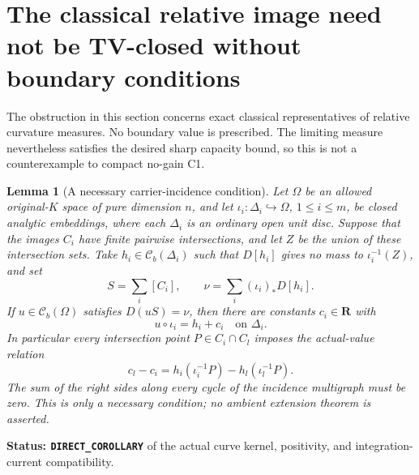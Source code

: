 \documentclass[11pt,a4paper]{article}
\numberwithin{equation}{section}
\newtheorem{lemma}[theorem]{Lemma}
\theoremstyle{definition}
\theoremstyle{remark}
\begin{document}


\section{The classical relative image need not be TV-closed without boundary conditions}
\label{sec:r5-two-intersection-image}

The obstruction in this section concerns exact classical
representatives of relative curvature measures.  No boundary
value is prescribed.  The limiting measure nevertheless satisfies
the desired sharp capacity bound, so this is not a counterexample
to compact no-gain C1.

\begin{lemma}[A necessary carrier-incidence condition]
\label{lem:r5-carrier-incidence}
Let $\Omega$ be an allowed original-$K$ space of pure dimension
$n$, and let $\iota_i:\Delta_i\hookrightarrow\Omega$,
$1\le i\le m$, be closed analytic embeddings, where each
$\Delta_i$ is an ordinary open unit disc.  Suppose that the
images $C_i$ have finite pairwise intersections, and let $Z$
be the union of these intersection sets.  Take $h_i\in\mathcal C_b(\Delta_i)$
such that $D[h_i]$ gives no mass to $\iota_i^{-1}(Z)$, and set
\[
 S=\sum_i[C_i],\qquad \nu=\sum_i(\iota_i)_*D[h_i].
\]
If $u\in\mathcal C_b(\Omega)$ satisfies $D(uS)=\nu$, then
there are constants $c_i\in\mathbf R$ with
\[
                 u\circ\iota_i=h_i+c_i\quad\text{on }\Delta_i.
\]
In particular every intersection point $P\in C_i\cap C_l$
imposes the actual-value relation
\begin{equation}
 c_l-c_i=h_i(\iota_i^{-1}P)-h_l(\iota_l^{-1}P).
 \label{eq:r5-carrier-incidence}
\end{equation}
The sum of the right sides along every cycle of the incidence
multigraph must be zero.  This is only a necessary condition;
no ambient extension theorem is asserted.
\end{lemma}

\noindent\textbf{Status: \texttt{DIRECT\_COROLLARY}} of
the actual curve kernel, positivity, and integration-current
compatibility.
\end{document}
